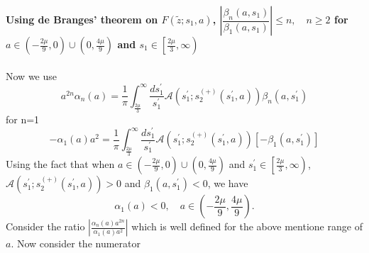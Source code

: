 ﻿\documentclass[12pt,a4paper]{article}
\begin{document}
\textbf{Using de Branges' theorem on $F\left(\tilde{z} ; s_{1}, a\right)$, $\left|\dfrac{\beta_{n}\left(a, s_{1}\right)}{\beta_{1}\left(a, s_{1}\right)}\right| \leq n, \quad n \geq 2$ for $a \in\left(-\frac{2 \mu}{9}, 0\right) \cup\left(0, \frac{4 \mu}{9}\right)$ and $s_{1} \in\left[\frac{2 \mu}{3}, \infty\right)$}\\\\
Now we use
$$
a^{2 n} \alpha_{n}(a)=\frac{1}{\pi} \int_{\frac{2 \mu}{3}}^{\infty} \frac{d s_{1}^{\prime}}{s_{1}^{\prime}} \mathcal{A}\left(s_{1}^{\prime} ; s_{2}^{(+)}\left(s_{1}^{\prime}, a\right)\right) \beta_{n}\left(a, s_{1}^{\prime}\right)
$$
for n=1
$$
-\alpha_{1}(a) a^{2}=\frac{1}{\pi} \int_{\frac{2 \mu}{3}}^{\infty} \frac{d s_{1}^{\prime}}{s_{1}^{\prime}} \mathcal{A}\left(s_{1}^{\prime} ; s_{2}^{(+)}\left(s_{1}^{\prime}, a\right)\right)\left[-\beta_{1}\left(a, s_{1}^{\prime}\right)\right]
$$
Using the fact that when $a \in\left(-\frac{2 \mu}{9}, 0\right) \cup\left(0, \frac{4 \mu}{9}\right)$ and $s_{1}^{\prime} \in\left[\frac{2 \mu}{3}, \infty\right)$,  $\mathcal{A}\left(s_{1}^{\prime} ; s_{2}^{(+)}\left(s_{1}^{\prime}, a\right)\right)>0$ and $\beta_{1}\left(a, s_{1}^{\prime}\right)<0$, we have
$$
\alpha_{1}(a)<0, \quad a \in\left(-\frac{2 \mu}{9}, \frac{4 \mu}{9}\right) .
$$
Consider the ratio $|\frac{\alpha_{n}(a) a^{2 n}}{\alpha_{1}(a) a^{2}}|$ which is well defined for the above mentione range of $a$. Now consider the numerator
\end{document}
